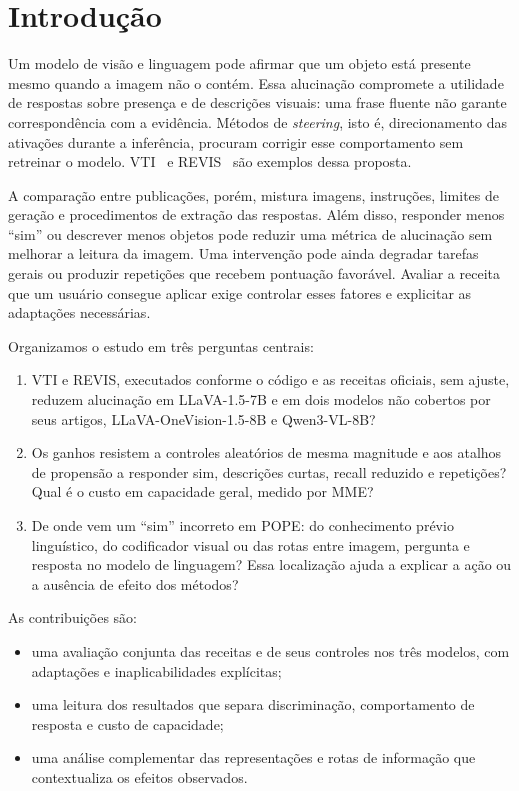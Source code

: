 \section{Introdução}
Um modelo de visão e linguagem pode afirmar que um objeto está presente mesmo quando a imagem não o contém. Essa alucinação compromete a utilidade de respostas sobre presença e de descrições visuais: uma frase fluente não garante correspondência com a evidência. Métodos de \textit{steering}, isto é, direcionamento das ativações durante a inferência, procuram corrigir esse comportamento sem retreinar o modelo. VTI~\cite{vti} e REVIS~\cite{revis} são exemplos dessa proposta.

A comparação entre publicações, porém, mistura imagens, instruções, limites de geração e procedimentos de extração das respostas. Além disso, responder menos ``sim'' ou descrever menos objetos pode reduzir uma métrica de alucinação sem melhorar a leitura da imagem. Uma intervenção pode ainda degradar tarefas gerais ou produzir repetições que recebem pontuação favorável. Avaliar a receita que um usuário consegue aplicar exige controlar esses fatores e explicitar as adaptações necessárias.

Organizamos o estudo em três perguntas centrais:
\begin{enumerate}
\item[\textbf{Q1.}] VTI e REVIS, executados conforme o código e as receitas oficiais, sem ajuste, reduzem alucinação em LLaVA-1.5-7B e em dois modelos não cobertos por seus artigos, LLaVA-OneVision-1.5-8B e Qwen3-VL-8B?
\item[\textbf{Q2.}] Os ganhos resistem a controles aleatórios de mesma magnitude e aos atalhos de propensão a responder sim, descrições curtas, recall reduzido e repetições? Qual é o custo em capacidade geral, medido por MME?
\item[\textbf{Q3.}] De onde vem um ``sim'' incorreto em POPE: do conhecimento prévio linguístico, do codificador visual ou das rotas entre imagem, pergunta e resposta no modelo de linguagem? Essa localização ajuda a explicar a ação ou a ausência de efeito dos métodos?
\end{enumerate}

As contribuições são:
\begin{itemize}
\item uma avaliação conjunta das receitas e de seus controles nos três modelos, com adaptações e inaplicabilidades explícitas;
\item uma leitura dos resultados que separa discriminação, comportamento de resposta e custo de capacidade;
\item uma análise complementar das representações e rotas de informação que contextualiza os efeitos observados.
\end{itemize}
